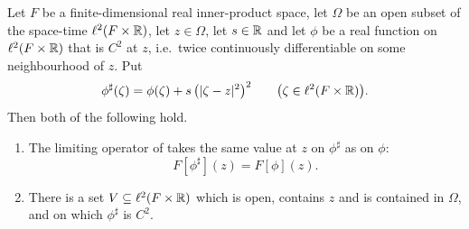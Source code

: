 \begin{lemma}
Let $F$ be a finite-dimensional real inner-product space, let $\Omega$ be an
open subset of the space-time $\ell^2(F\times\mathbb{R})$, let $z\in\Omega$, let
$s\in\mathbb{R}$ and let $\phi$ be a real function on $\ell^2(F\times\mathbb{R})$ that is $C^2$
at $z$, i.e.\ twice continuously differentiable on some neighbourhood of $z$.
Put
\[
  \phi^\sharp(\zeta)=\phi(\zeta)+s\,\bigl(|\zeta-z|^2\bigr)^2
  \qquad\bigl(\zeta\in\ell^2(F\times\mathbb{R})\bigr).
\]
Then both of the following hold.
\begin{enumerate}
\item The limiting operator of  takes the same value at $z$ on
$\phi^\sharp$ as on $\phi$:
\begin{equation}\label{eq:qbjr-same-jet}
  F[\phi^\sharp](z)=F[\phi](z).
\end{equation}
\item There is a set $V\subseteq\ell^2(F\times\mathbb{R})$ which is open, contains $z$
and is contained in $\Omega$, and on which $\phi^\sharp$ is $C^2$.
\end{enumerate}
\end{lemma}
